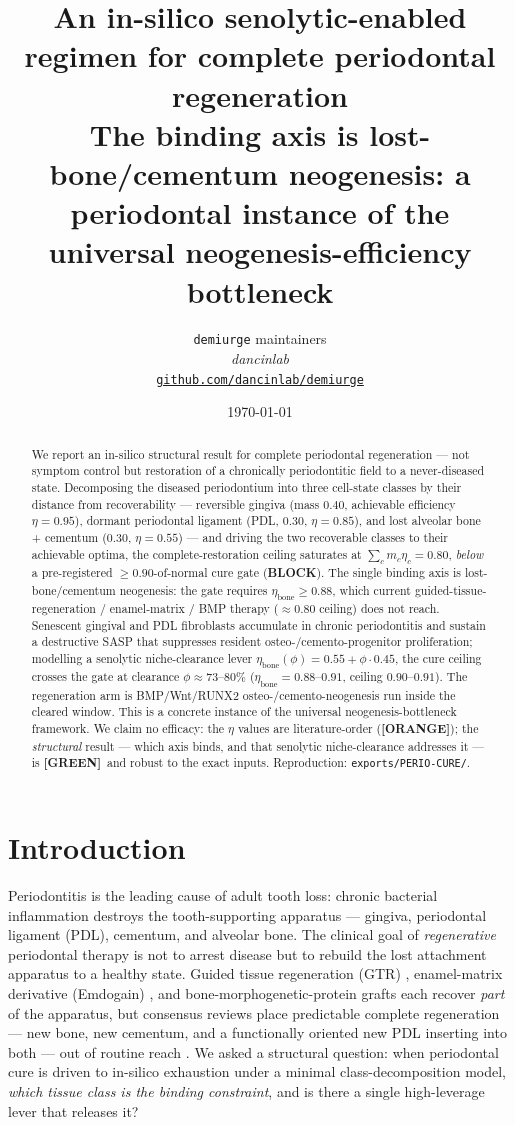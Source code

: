 \documentclass[11pt,a4paper]{article}
\title{
  \textbf{An in-silico senolytic-enabled regimen for complete periodontal
  regeneration}\\[4pt]
  \large The binding axis is lost-bone/cementum neogenesis: a periodontal instance
  of the universal neogenesis-efficiency bottleneck
}
\author{
  \texttt{demiurge} maintainers\\
  \normalsize\textit{dancinlab}\\[2pt]
  \normalsize\href{https://github.com/dancinlab/demiurge}{\texttt{github.com/dancinlab/demiurge}}
}
\date{\today}
\newcommand{\tierbadge}[2]{\textcolor{#1}{\textbf{[#2]}}}
\providecommand{\tierGreen}{\tierbadge{green!45!black}{GREEN}}
\providecommand{\tierOrange}{\tierbadge{orange!80!black}{ORANGE}}
\begin{document}
\maketitle

\begin{abstract}
We report an in-silico structural result for complete periodontal regeneration ---
not symptom control but restoration of a chronically periodontitic field to a
never-diseased state. Decomposing the diseased periodontium into three cell-state
classes by their distance from recoverability --- reversible gingiva (mass $0.40$,
achievable efficiency $\eta=0.95$), dormant periodontal ligament (PDL, $0.30$,
$\eta=0.85$), and lost alveolar bone + cementum ($0.30$, $\eta=0.55$) --- and
driving the two recoverable classes to their achievable optima, the
complete-restoration ceiling saturates at $\sum_c m_c\eta_c = 0.80$, \emph{below}
a pre-registered $\geq 0.90$-of-normal cure gate (\textbf{BLOCK}). The single
binding axis is lost-bone/cementum neogenesis: the gate requires
$\eta_{\text{bone}}\geq 0.88$, which current guided-tissue-regeneration / enamel-matrix
/ BMP therapy ($\approx 0.80$ ceiling) does not reach. Senescent gingival and PDL
fibroblasts accumulate in chronic periodontitis and sustain a destructive SASP that
suppresses resident osteo-/cemento-progenitor proliferation; modelling a senolytic
niche-clearance lever $\eta_{\text{bone}}(\phi)=0.55+\phi\cdot 0.45$, the cure
ceiling crosses the gate at clearance $\phi\approx 73$--$80\%$ ($\eta_{\text{bone}}
=0.88$--$0.91$, ceiling $0.90$--$0.91$). The regeneration arm is BMP/Wnt/RUNX2
osteo-/cemento-neogenesis run inside the cleared window. This is a concrete instance
of the universal neogenesis-bottleneck framework. We claim no efficacy: the $\eta$
values are literature-order (\tierOrange); the \emph{structural} result --- which
axis binds, and that senolytic niche-clearance addresses it --- is \tierGreen\ and
robust to the exact inputs. Reproduction: \texttt{exports/PERIO-CURE/}.
\end{abstract}

\section{Introduction}
\label{sec:intro}
Periodontitis is the leading cause of adult tooth loss: chronic bacterial
inflammation destroys the tooth-supporting apparatus --- gingiva, periodontal
ligament (PDL), cementum, and alveolar bone. The clinical goal of
\emph{regenerative} periodontal therapy is not to arrest disease but to rebuild
the lost attachment apparatus to a healthy state. Guided tissue regeneration
(GTR) \citep{nyman1982}, enamel-matrix derivative (Emdogain)
\citep{hammarstrom1997}, and bone-morphogenetic-protein grafts \citep{wozney1988}
each recover \emph{part} of the apparatus, but consensus reviews place
predictable complete regeneration --- new bone, new cementum, and a functionally
oriented new PDL inserting into both --- out of routine reach \citep{kao2015}.
We asked a structural question: when periodontal cure is driven to in-silico
exhaustion under a minimal class-decomposition model, \emph{which tissue class is
the binding constraint}, and is there a single high-leverage lever that releases it?
\end{document}
